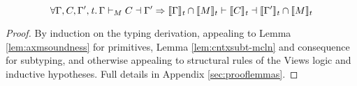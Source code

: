 \begin{lemma}
  \label{lemma:embedw}
  \[
\forall\Gamma,C,\Gamma',\mathit{t}\ldotp\Gamma\vdash_M C\dashv \Gamma' \Rightarrow
\llbracket\Gamma\rrbracket_\mathit{t}\cap\llbracket{M}\rrbracket_t\vdash \llbracket C\rrbracket_\mathit{t}\dashv\llbracket\Gamma'\rrbracket_\mathit{t}\cap\llbracket{M}\rrbracket_t
\]
\end{lemma}
\begin{proof}
By induction on the typing derivation, appealing to Lemma \ref{lem:axmsoundness} for primitives, Lemma \ref{lem:cntxsubt-mcln} and consequence for subtyping, and otherwise appealing to structural rules of the Views logic and inductive hypotheses.
Full details in Appendix \ref{sec:prooflemmas}. %
  \end{proof}

